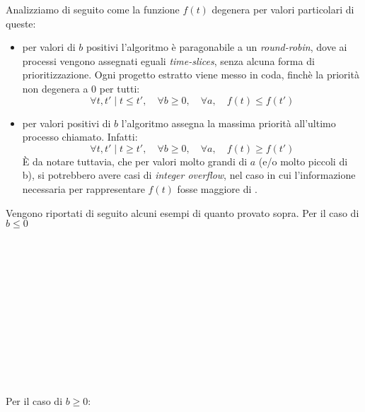 \documentclass[11pt]{article}
\begin{document}
Analizziamo di seguito come la funzione
$f(t)$ degenera per valori particolari di queste:
\begin{itemize}
\item per valori di $b$ positivi l'algoritmo \`e paragonabile a un \emph{round-robin}, dove ai processi
 vengono assegnati eguali \emph{time-slices}, senza alcuna forma di prioritizzazione. Ogni progetto estratto
viene messo in coda, finch\`e la priorit\`a non degenera a $0$ per tutti:
$$
\forall t, t'\mid t \le t', \quad \forall b \ge 0,\quad \forall a,
\quad f(t) \le f(t')
$$

\item per valori positivi di $b$ l'algoritmo assegna la massima priorit\`a all'ultimo processo chiamato.
Infatti:
$$
\forall t, t'\mid t \ge t', \quad \forall b \ge 0,\quad \forall a,
\quad f(t) \ge f(t')
$$
\`E da notare tuttavia, che per valori molto grandi di $a$ (e/o molto piccoli di b),
 si potrebbero avere casi di \emph{integer overflow}, nel caso in cui l'informazione
necessaria per rappresentare $f(t)$ fosse maggiore di .
\end{itemize}
Vengono riportati di seguito alcuni esempi di quanto provato sopra. Per il caso di $b \le 0$
\\
\\
\\
\\
\\ 
\\
\\
\\
\\
\\
\\
\\
\\Per il caso di $b \ge 0$:
\\
\\
\\
\\
\\ 
\\
\\
\end{document}
